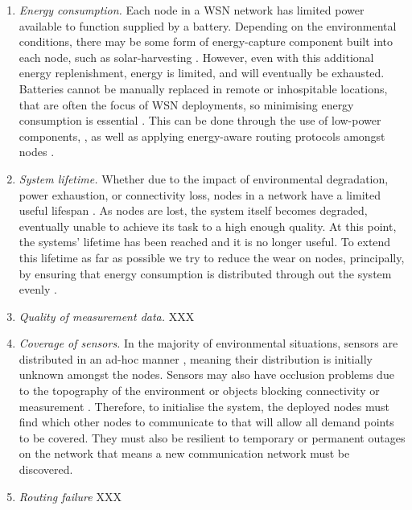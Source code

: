 \begin{enumerate}
\item \textit{Energy consumption.} Each node in a WSN network has limited power available to function supplied by a battery. Depending on the environmental conditions, there may be some form of energy-capture component built into each node, such as solar-harvesting \citep{Prauzek2018}. However, even with this additional energy replenishment, energy is limited, and will eventually be exhausted. Batteries cannot be manually replaced in remote or inhospitable locations, that are often the focus of WSN deployments, so minimising energy consumption is essential \citep{Anastasi2009}. This can be done through the use of low-power components, \citep{4772585, 8108667}, as well as applying energy-aware routing protocols amongst nodes \citep{s90100445}. 

\item \textit{System lifetime.} Whether due to the impact of environmental degradation, power exhaustion, or connectivity loss, nodes in a network have a limited useful lifespan \citep{Mak2009}. As nodes are lost, the system itself becomes degraded, eventually unable to achieve its task to a high enough quality. At this point, the systems' lifetime has been reached and it is no longer useful. To extend this lifetime as far as possible we try to reduce the wear on nodes, principally, by ensuring that energy consumption is distributed through out the system evenly \citep{BABAYO20171176, Engmann2018}.

\item \textit{Quality of measurement data.} XXX

\item \textit{Coverage of sensors.} In the majority of environmental situations, sensors are distributed in an ad-hoc manner \citep{DUMMY}, meaning their distribution is initially unknown amongst the nodes. Sensors may also have occlusion problems due to the topography of the environment or objects blocking connectivity or measurement \citep{10.1007/978-3-540-69170-9_23}. Therefore, to initialise the system, the deployed nodes must find which other nodes to communicate to that will allow all demand points to be covered. They must also be resilient to temporary or permanent outages on the network that means a new communication network must be discovered. 

\item \textit{Routing failure} XXX \citep{Paradis2007}

\end{enumerate}

